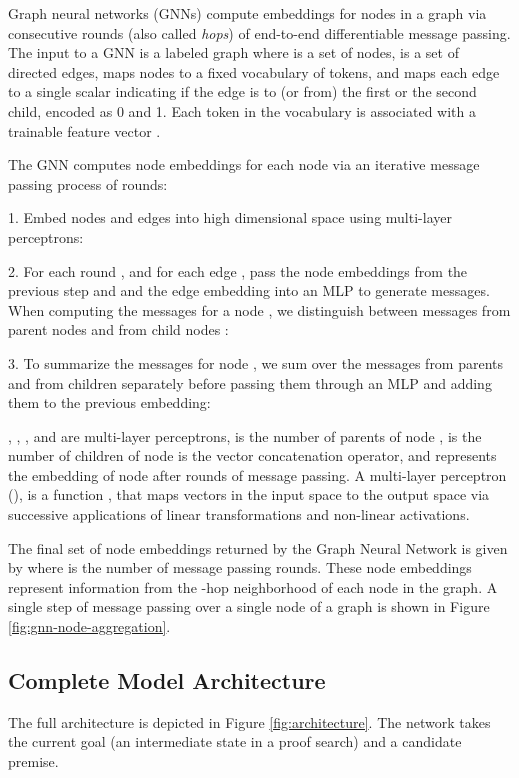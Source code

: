 \documentclass[letterpaper]{article} \usepackage{aaai20}  \usepackage{times}  \usepackage{helvet} \usepackage{courier}  \usepackage[hyphens]{url}  \usepackage{graphicx} \urlstyle{rm} \def\UrlFont{\rm}  \usepackage{graphicx}  \frenchspacing  \setlength{\pdfpagewidth}{8.5in}  \setlength{\pdfpageheight}{11in}
\begin{document}
Graph neural networks (GNNs) compute embeddings for nodes in a graph via consecutive rounds (also called \emph{hops}) of end-to-end differentiable message passing.
The input to a GNN is a labeled graph  where  is a set of nodes,  is a set of directed edges,  maps nodes to a fixed vocabulary of tokens, and  maps each edge  to a single scalar indicating if the edge is to (or from) the first or the second child, encoded as 0 and 1.
Each token  in the vocabulary is associated with a trainable feature vector .

The GNN computes node embeddings  for each node  via an iterative message passing process of  rounds:

    1. Embed nodes  and edges  into high dimensional space using multi-layer perceptrons:
    
    

    2. For each round , and for each edge , pass the node embeddings from the previous step  and  and the edge embedding  into an MLP to generate messages. 
    When computing the messages for a node , we distinguish between messages from parent nodes  and from child nodes :
    
    

    3. To summarize the messages for node , we sum over the messages from parents and from children separately before passing them through an MLP and adding them to the previous embedding: 
    

, , ,  and  are multi-layer perceptrons,  is the number of parents of node ,  is the number of children of node   is the vector concatenation operator, and  represents the embedding of node  after  rounds of message passing. A multi-layer perceptron (), is a function , that maps vectors in the input space to the output space via successive applications of linear transformations and non-linear activations.

The final set of node embeddings returned by the Graph Neural Network is given by  where  is the number of message passing rounds. These node embeddings represent information from the -hop neighborhood of each node in the graph. A single step of message passing over a single node of a graph is shown in Figure \ref{fig:gnn-node-aggregation}.


\subsection{Complete Model Architecture}
\label{sec:full_model}

The full architecture is depicted in Figure \ref{fig:architecture}. 
The network takes the current goal (an intermediate state in a proof search) and a candidate premise.
\end{document}
